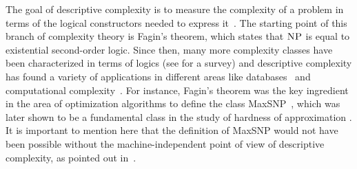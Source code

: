 
%
%
%	
%	
%	
%	
%

The goal of descriptive complexity is to measure the complexity of a problem in terms of the logical constructors needed to express it~\cite{I99,G07}. 
The starting point of this branch of complexity theory is Fagin's theorem, which states that $\text{\sc NP}$ is equal to existential second-order logic. Since then, many more complexity classes have been characterized in terms of logics (see \cite{G07} for a survey) and descriptive complexity has found a variety of applications in different areas like databases~\cite{V82,I86,ACY91,G92} and computational complexity~\cite{AV95,I99,L04,G07}.
For instance, Fagin's theorem was the key ingredient in the area of optimization algorithms to define the class {\sc MaxSNP}~\cite{PY91}, which was later shown to be a fundamental class in the study of hardness of approximation \cite{ALMSS98,V04}. 
It is important to mention here that the definition of {\sc MaxSNP} would not have been possible without the machine-independent point of view of descriptive complexity, as pointed out in~\cite{PY91}.

